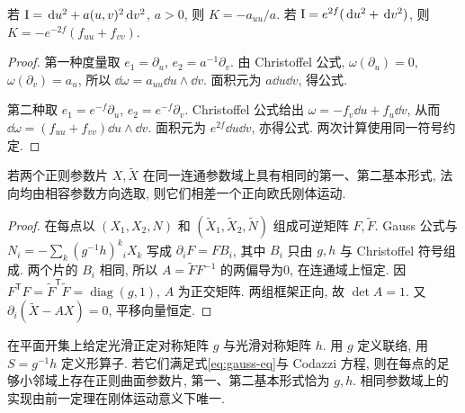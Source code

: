 \begin{proposition}\label{prop:metric-K}
若 $\mathrm{I}=\,\mathrm d u^2+a(u,v)^2\,\mathrm d v^2$, $a>0$, 则 $K=-a_{uu}/a$. 若 $\mathrm{I}=e^{2f}(\,\mathrm d u^2+\,\mathrm d v^2)$, 则 $K=-e^{-2f}(f_{uu}+f_{vv})$.
\end{proposition}
\begin{proof}
第一种度量取 $e_1=\partial_u$, $e_2=a^{-1}\partial_v$. 由 Christoffel 公式, $\omega(\partial_u)=0$, $\omega(\partial_v)=a_u$, 所以 $\dd\omega=a_{uu}\dd u\wedge\dd v$. 面积元为 $a\dd u\dd v$, 得公式.

第二种取 $e_1=e^{-f}\partial_u$, $e_2=e^{-f}\partial_v$. Christoffel 公式给出 $\omega=-f_v\dd u+f_u\dd v$, 从而 $\dd\omega=(f_{uu}+f_{vv})\dd u\wedge\dd v$. 面积元为 $e^{2f}\dd u\dd v$, 亦得公式. 两次计算使用同一符号约定.
\end{proof}
\begin{theorem}[刚性部分]\label{thm:surface-rigidity}
若两个正则参数片 $X,\widetilde X$ 在同一连通参数域上具有相同的第一、第二基本形式, 法向均由相容参数方向选取, 则它们相差一个正向欧氏刚体运动.
\end{theorem}
\begin{proof}
在每点以 $(X_1,X_2,N)$ 和 $(\widetilde X_1,\widetilde X_2,\widetilde N)$ 组成可逆矩阵 $F,\widetilde F$. Gauss 公式与 $N_i=-\sum_k(g^{-1}h)^k{}_iX_k$ 写成 $\partial_iF=F B_i$, 其中 $B_i$ 只由 $g,h$ 与 Christoffel 符号组成. 两个片的 $B_i$ 相同, 所以 $A=\widetilde FF^{-1}$ 的两偏导为0, 在连通域上恒定. 因 $F^{\mathsf T}F=\widetilde F^{\mathsf T}\widetilde F=\operatorname{diag}(g,1)$, $A$ 为正交矩阵. 两组框架正向, 故 $\det A=1$. 又 $\partial_i(\widetilde X-AX)=0$, 平移向量恒定.
\end{proof}
\begin{theorem}[曲面基本定理的局部存在性]\label{thm:surface-existence}
在平面开集上给定光滑正定对称矩阵 $g$ 与光滑对称矩阵 $h$. 用 $g$ 定义联络, 用 $S=g^{-1}h$ 定义形算子. 若它们满足式\eqref{eq:gauss-eq}与 Codazzi 方程, 则在每点的足够小邻域上存在正则曲面参数片, 第一、第二基本形式恰为 $g,h$. 相同参数域上的实现由前一定理在刚体运动意义下唯一.
\end{theorem}
